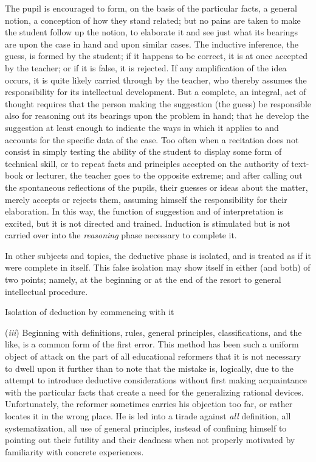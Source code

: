 \documentclass[letterpaper]{book}
\begin{document}
The pupil is encouraged to form, on the basis of the particular facts, a
general notion, a conception of how they stand related; but no pains are
taken to make the student follow up the notion, to elaborate it and see
just what its bearings are upon the case in hand and upon similar cases.
The inductive inference, the guess, is formed by the student; if it
happens to be correct, it is at once accepted by the teacher; or if it
is false, it is rejected. If any amplification of the idea occurs, it
is
quite likely carried through by the teacher, who thereby assumes the
responsibility for its intellectual development. But a complete, an
integral, act of thought requires that the person making the suggestion
(the guess) be responsible also for reasoning out its bearings upon the
problem in hand; that he develop the suggestion at least enough to
indicate the ways in which it applies to and accounts for the specific
data of the case. Too often when a recitation does not consist in simply
testing the ability of the student to display some form of technical
skill, or to repeat facts and principles accepted on the authority of
text-book or lecturer, the teacher goes to the opposite extreme; and
after calling out the spontaneous reflections of the pupils, their
guesses or ideas about the matter, merely accepts or rejects them,
assuming himself the responsibility for their elaboration. In this way,
the function of suggestion and of interpretation is excited, but it is
not directed and trained. Induction is stimulated but is not carried
over into the \emph{reasoning} phase necessary to complete it.

In other subjects and topics, the deductive phase is isolated, and is
treated as if it were complete in itself. This false isolation may show
itself in either (and both) of two points; namely, at the beginning or
at the end of the resort to general intellectual procedure.



Isolation of deduction by commencing with it

(\emph{iii}) Beginning with definitions, rules, general principles,
classifications, and the like, is a common form of the first error. This
method has been such a uniform object of attack on the part of all
educational reformers that it is not necessary to dwell upon it further
than to note that the mistake is, logically, due to the attempt to
introduce deductive considerations without first making acquaintance
with the particular facts
that
create a need for the generalizing rational devices. Unfortunately, the
reformer sometimes carries his objection too far, or rather locates it
in the wrong place. He is led into a tirade against \emph{all}
definition, all systematization, all use of general principles, instead
of confining himself to pointing out their futility and their deadness
when not properly motivated by familiarity with concrete experiences.
\end{document}
